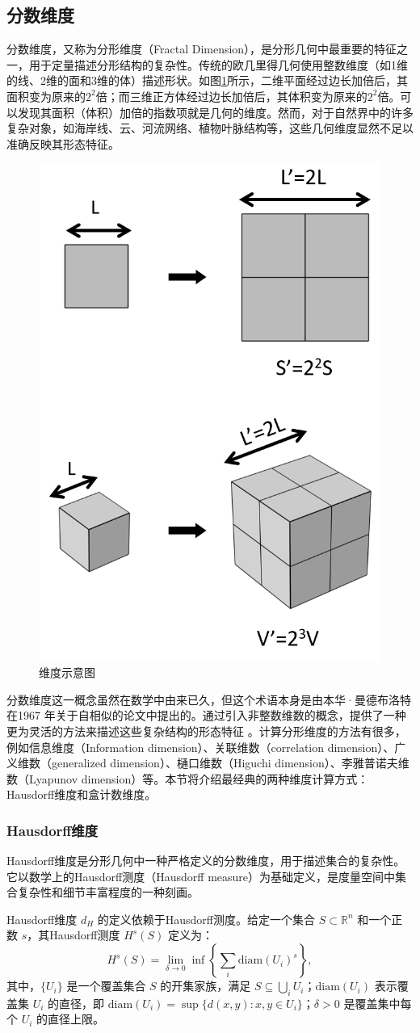 \subsection{分数维度}
分数维度，又称为分形维度（Fractal Dimension），是分形几何中最重要的特征之一，用于定量描述分形结构的复杂性。传统的欧几里得几何使用整数维度（如1维的线、2维的面和3维的体）描述形状。如图\ref{fig:Dimension}所示，二维平面经过边长加倍后，其面积变为原来的$2^2$倍；而三维正方体经过边长加倍后，其体积变为原来的$2^2$倍。可以发现其面积（体积）加倍的指数项就是几何的维度。然而，对于自然界中的许多复杂对象，如海岸线、云、河流网络、植物叶脉结构等，这些几何维度显然不足以准确反映其形态特征。

\begin{figure}[htbp]
    \centering
    \includegraphics[width=0.3\linewidth]{figure/FractalTopo/Dimension.png}
    \caption{维度示意图}
    \label{fig:Dimension}
\end{figure}

分数维度这一概念虽然在数学中由来已久，但这个术语本身是由本华·曼德布洛特在1967 年关于自相似的论文中提出的\cite{mandelbrot1967coast}。通过引入非整数维数的概念，提供了一种更为灵活的方法来描述这些复杂结构的形态特征 \cite{Mandelbrot1982,falconer2013fractal}。计算分形维度的方法有很多，例如信息维度（Information dimension）、关联维数（correlation dimension）、广义维数（generalized dimension）、樋口维数（Higuchi dimension）、李雅普诺夫维数（Lyapunov dimension）等。本节将介绍最经典的两种维度计算方式：Hausdorff维度和盒计数维度。

\subsubsection{Hausdorff维度}
Hausdorff维度是分形几何中一种严格定义的分数维度，用于描述集合的复杂性。它以数学上的Hausdorff测度（Hausdorff measure）为基础定义，是度量空间中集合复杂性和细节丰富程度的一种刻画。

Hausdorff维度 $d_H$ 的定义依赖于Hausdorff测度。给定一个集合 $S \subset \mathbb{R}^n$ 和一个正数 $s$，其Hausdorff测度 $H^s(S)$ 定义为：
\begin{equation}
    H^s(S) = \lim_{\delta \to 0} \inf \left\{ \sum_i \text{diam}(U_i)^s \right\},
\end{equation}
其中，$\{U_i\}$ 是一个覆盖集合 $S$ 的开集家族，满足 $S \subseteq \bigcup_i U_i$；$\text{diam}(U_i)$ 表示覆盖集 $U_i$ 的直径，即 $\text{diam}(U_i) = \sup\{d(x, y) : x, y \in U_i\}$；$\delta > 0$ 是覆盖集中每个 $U_i$ 的直径上限。

